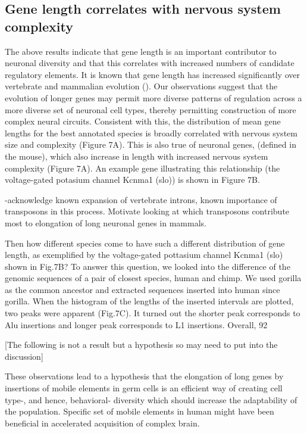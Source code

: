 \subsection{Gene length correlates with nervous system complexity}

The above results indicate that gene length is an important contributor to neuronal diversity and that this correlates with increased numbers of candidate regulatory elements. It is known that gene length has increased significantly over vertebrate and mammalian evolution (). Our observations suggest that the evolution of longer genes may permit more diverse patterns of regulation across a more diverse set of neuronal cell types, thereby permitting construction of more complex neural circuits. Consistent with this, the distribution of mean gene lengths for the best annotated species is broadly correlated with nervous system size and complexity (Figure 7A). This is also true of neuronal genes, (defined in the mouse), which also increase in length with increased nervous system complexity (Figure 7A). An example gene illustrating this relationship (the voltage-gated potasium channel Kcnma1 (slo)) is shown in Figure 7B. 

-acknowledge known expansion of vertebrate introns, known importance of transposons in this process. Motivate looking at which transposons contribute most to elongation of long neuronal genes in mammals.

Then how different species come to have such a different distribution of gene length, as exemplified by the voltage-gated pottasium channel Kcnma1 (slo) shown in Fig.7B? To answer this question, we looked into the difference of the genomic sequences of a pair of closest species, human and chimp. We used gorilla as the common ancestor and extracted sequences inserted into human since gorilla. When the histogram of the lengths of the inserted intervals are plotted, two peaks were apparent (Fig.7C). It turned out the shorter peak corresponds to Alu insertions and longer peak corresponds to L1 insertions. Overall, 92%

[The following is not a result but a hypothesis so may need to put into the discussion]

These observations lead to a hypothesis that the elongation of long genes by insertions of mobile elements in germ cells is an efficient way of creating cell type-, and hence, behavioral- diversity which should increase the adaptability of the population. Specific set of mobile elements in human might have been beneficial in accelerated acquisition of complex brain.
